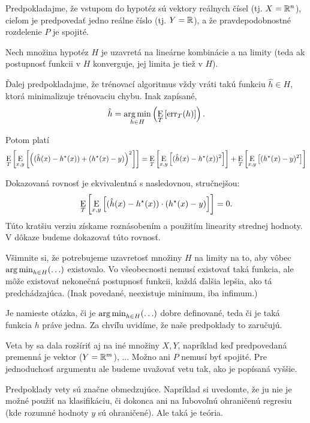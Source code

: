\begin{theorem} \label{theorem:proj1}
  Predpokladajme, že vstupom do hypotéz sú vektory reálnych čísel
  (tj. $X = \mathbb{R}^n$), cieľom je predpovedať jedno reálne číslo
  (tj. $Y = \mathbb{R}$), a že pravdepodobnostné rozdelenie $P$ je spojité.
  
  Nech množina hypotéz $H$ je uzavretá na lineárne kombinácie a na
  limity (teda ak postupnosť funkcii v $H$ konverguje, jej limita
  je tiež v $H$).
  
  Ďalej predpokladajme, že trénovací algoritmus vždy vráti takú funkciu
  $\hat{h} \in H$, ktorá minimalizuje trénovaciu chybu. Inak zapísané,
  $$\hat{h} = \operatorname*{arg\,min}_{h \in H} \left( \operatorname*{\mathrm{E}}_T \left[ \mathrm{err}_T(h) \right] \right).$$
  
  Potom platí
  $$\operatorname*{\mathrm{E}}_T \left[ \operatorname*{\mathrm{E}}_{x,y} \left[ \left( (\hat{h}(x) - h^\star(x)) + (h^\star(x) - y) \right)^2 \right] \right] = \operatorname*{\mathrm{E}}_T \left[ \operatorname*{\mathrm{E}}_{x,y} \left[ (\hat{h}(x) - h^\star(x))^2 \right] \right] + \operatorname*{\mathrm{E}}_T \left[ \operatorname*{\mathrm{E}}_{x,y} \left[ (h^\star(x) - y)^2 \right] \right]$$
\end{theorem}
\begin{remark}
  Dokazovaná rovnosť je ekvivalentná s nasledovnou, stručnejšou:
  $$\operatorname*{\mathrm{E}}_T \left[ \operatorname*{\mathrm{E}}_{x, y} \left[ (\hat{h}(x) - h^\star(x)) \cdot (h^\star(x) - y) \right] \right] = 0.$$
  Túto kratšiu verziu získame roznásobením a použitím linearity strednej
  hodnoty. V dôkaze budeme dokazovať túto rovnosť.
\end{remark}
\begin{remark}
  Všimnite si, že potrebujeme uzavretosť množiny $H$ na limity na to,
  aby vôbec $\operatorname*{arg\,min}_{h \in H} (\ldots)$ existovalo. Vo všeobecnosti
  nemusí existovať taká funkcia, ale môže existovať nekonečná postupnosť
  funkcii, každá ďalšia lepšia, ako tá predchádzajúca. (Inak povedané,
  neexistuje minimum, iba infimum.)
\end{remark}
\begin{remark}
  Je namieste otázka, či je $\operatorname*{arg\,min}_{h \in H} (\ldots)$ dobre definované,
  teda či je taká funkcia $h$ práve jedna. Za chvíľu uvidíme, že naše
  predpoklady to zaručujú.
\end{remark}
\begin{remark}
  Veta by sa dala rozšíriť aj na iné množiny $X, Y$, napríklad keď
  predpovedaná premenná je vektor ($Y = \mathbb{R}^m$), ... Možno ani $P$
  nemusí byť spojité. Pre jednoduchosť argumentu ale budeme uvažovať
  vetu tak, ako je popísaná vyššie.
\end{remark}
\begin{remark}
  Predpoklady vety sú značne obmedzujúce. Napríklad si uvedomte, že
  ju nie je možné použiť na klasifikáciu, či dokonca ani na ľubovoľnú
  ohraničenú regresiu (kde rozumné hodnoty $y$ sú ohraničené). Ale taká
  je teória.
\end{remark}

